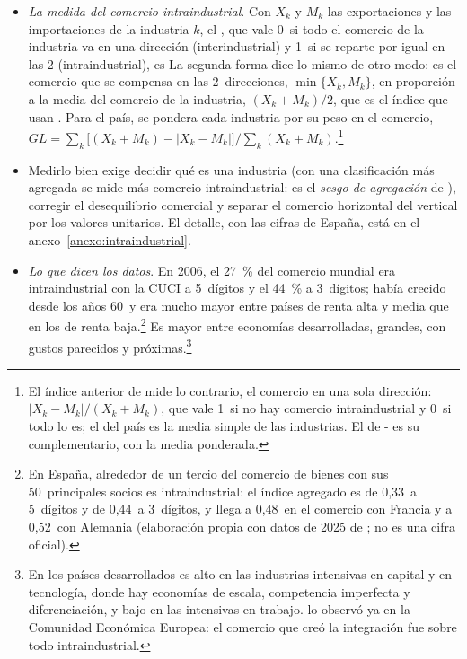\documentclass[11pt]{article}
\begin{document}
\begin{itemize}
\item \emph{La medida del comercio intraindustrial}. Con $X_k$ y $M_k$ las exportaciones y las importaciones de la industria $k$, el \nocite{GrubelLloyd1971Empirical}, que vale 0~si todo el comercio de la industria va en una dirección (interindustrial) y 1~si se reparte por igual en las 2 (intraindustrial), es
  La segunda forma dice lo mismo de otro modo: es el comercio que se compensa en las 2~direcciones, $\min\{X_k,M_k\}$, en proporción a la media del comercio de la industria, $(X_k+M_k)/2$, que es el índice que usan \textcite[cap.~8]{KrugmanObstfeldMelitz2018International}. Para el país, se pondera cada industria por su peso en el comercio, $GL=\sum_k\big[(X_k+M_k)-|X_k-M_k|\big]\big/\sum_k(X_k+M_k)$.\footnote{El índice anterior de \textcite{Balassa1966Tariff} mide lo contrario, el comercio en una sola dirección: $|X_k-M_k|/(X_k+M_k)$, que vale 1~si no hay comercio intraindustrial y 0~si todo lo es; el del país es la media simple de las industrias. El de - es su complementario, con la media ponderada.}
\item Medirlo bien exige decidir qué es una industria (con una clasificación más agregada se mide más comercio intraindustrial: es el \emph{sesgo de agregación} de \textcite{Finger1975Trade}), corregir el desequilibrio comercial y separar el comercio horizontal del vertical por los valores unitarios. El detalle, con las cifras de España, está en el anexo~\ref{anexo:intraindustrial}.
\item \emph{Lo que dicen los datos}. En 2006, el 27~\% del comercio mundial era intraindustrial con la CUCI a 5~dígitos y el 44~\% a 3~dígitos; había crecido desde los años 60~y era mucho mayor entre países de renta alta y media que en los de renta baja\nocite{Brulhart2009Account}.\footnote{En España, alrededor de un tercio del comercio de bienes con sus 50~principales socios es intraindustrial: el índice agregado es de 0,33~a 5~dígitos y de 0,44~a 3~dígitos, y llega a 0,48~en el comercio con Francia y a 0,52~con Alemania (elaboración propia con datos de 2025 de \textcite{Eurostat2026Comext}; no es una cifra oficial).} Es mayor entre economías desarrolladas, grandes, con gustos parecidos y próximas\nocite{GreenawayMilner1986Economics}.\footnote{En los países desarrollados es alto en las industrias intensivas en capital y en tecnología, donde hay economías de escala, competencia imperfecta y diferenciación, y bajo en las intensivas en trabajo.  lo observó ya en la Comunidad Económica Europea: el comercio que creó la integración fue sobre todo intraindustrial\nocite{Balassa1966Tariff}.}

\end{itemize}
\end{document}
